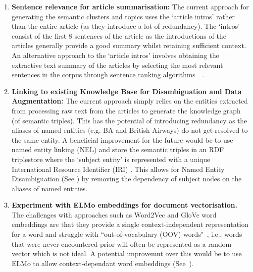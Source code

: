 \begin{enumerate}
    \item \textbf{Sentence relevance for article summarisation:} The current approach for generating the semantic clusters and topics uses the `article intros' rather than the entire article (as they introduce a lot of redundancy). The `intros' consist of the first 8 sentences of the article as the introductions of the articles generally provide a good summary whilst retaining sufficient context. An alternative approach to the `article intros' involves obtaining the extractive text summary of the articles by selecting the most relevant sentences in the corpus through sentence ranking algorithms~\cite{jevzek2008automatic}~\cite{madhuri2019extractive}. 
    
    \item \textbf{Linking to existing Knowledge Base for Disambiguation and Data Augmentation:} The current approach simply relies on the entities extracted from processing raw text from the articles to generate the knowledge graph (of semantic triples). This has the potential of introducing redundancy as the aliases of named entities (e.g. BA and British Airways) do not get resolved to the same entity. A beneficial improvement for the future would be to use named entity linking (NEL)\cite{retrospective_kg} and store the semantic triples in an RDF triplestore where the `subject entity' is represented with a unique International Resource Identifier (IRI) \cite{internationalized}. This allows for Named Entity Disambiguation (See ) by removing the dependency of subject nodes on the aliases of named entities. 
    
    \item \textbf{Experiment with ELMo embeddings for document vectorisation.}  The challenges with approaches such as Word2Vec and GloVe word embeddings are that they provide a single context-independent representation for a word and struggle with ``out-of-vocabulary (OOV) words"~\cite{elmo_word_rep}, i.e., words that were never encountered prior will often be represented as a random vector which is not ideal. A potential improvemnt over this would be to use ELMo to allow context-dependant word embeddings (See~).
    
\end{enumerate}
